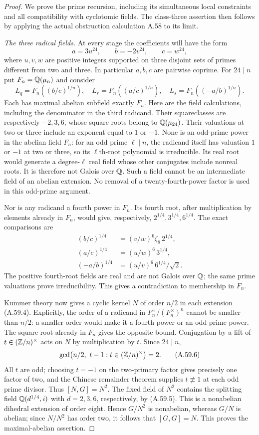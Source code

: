 \begin{proof}
We prove the prime recursion, including its simultaneous
local constraints and all compatibility with cyclotomic
fields. The class-three assertion then follows by applying
the actual obstruction calculation A.58 to its limit.

\emph{The three radical fields.}
At every stage the coefficients will have the form
\[
 a=3u^{24},\qquad b=-2v^{24},\qquad c=w^{24},
 \tag{A.59.3}
\]
where $u,v,w$ are positive integers supported on three
disjoint sets of primes different from two and three.
In particular $a,b,c$ are pairwise coprime.
For $24\mid n$ put $F_n=\mathbb Q(\mu_n)$ and consider
\[
 L_q=F_n((b/c)^{1/n}),\quad
 L_r=F_n((a/c)^{1/n}),\quad
 L_s=F_n((-a/b)^{1/n}).
 \tag{A.59.4}
\]
Each has maximal abelian subfield exactly $F_n$.
Here are the field calculations, including the denominator
in the third radicand. Their squareclasses are respectively
$-2,3,6$, whose square roots belong to $\mathbb Q(\mu_{24})$.
Their valuations at two or three include an exponent
equal to $1$ or $-1$. None is an odd-prime power in the
abelian field $F_n$: for an odd prime $\ell\mid n$,
the radicand itself has valuation $1$ or $-1$ at
two or three, so its $\ell$th-root polynomial is
irreducible. Its real root would generate a degree-$\ell$
real field whose other conjugates include nonreal roots.
It is therefore not Galois over $\mathbb Q$. Such a field
cannot be an intermediate field of an abelian extension.
No removal of a twenty-fourth-power factor is used
in this odd-prime argument.

Nor is any radicand a fourth power in $F_n$.
Its fourth root, after multiplication by elements
already in $F_n$, would give, respectively,
$2^{1/4},3^{1/4},6^{1/4}$. The exact comparisons are
\[
 \begin{split}
 (b/c)^{1/4}&=(v/w)^6\zeta_8\,2^{1/4},\\
 (a/c)^{1/4}&=(u/w)^6\,3^{1/4},\\
 (-a/b)^{1/4}&=(u/v)^6\,6^{1/4}/\sqrt2 .
 \end{split}
 \tag{A.59.5}
\]
The positive fourth-root fields are real and are not
Galois over $\mathbb Q$; the same prime valuations prove
irreducibility. This gives a contradiction to membership
in $F_n$.

Kummer theory now gives a cyclic kernel $N$ of order
$n/2$ in each extension (A.59.4). Explicitly, the order
of a radicand in $F_n^\times/(F_n^\times)^n$ cannot
be smaller than $n/2$: a smaller order would make it
a fourth power or an odd-prime power. The square root
already in $F_n$ gives the opposite bound.
Conjugation by a lift of
$t\in(\mathbb Z/n)^\times$ acts on $N$ by multiplication
by $t$. Since $24\mid n$,
\[
       \gcd\bigl(n/2,\ t-1:t\in(\Z/n)^\times\bigr)=2.
 \tag{A.59.6}
\]
All $t$ are odd; choosing $t=-1$ on the two-primary
factor gives precisely one factor of two, and the
Chinese remainder theorem supplies $t\not\equiv1$
at each odd prime divisor. Thus $[N,G]=N^2$.
The fixed field of $N^2$ contains the splitting field
$\mathbb Q(d^{1/4},i)$ with $d=2,3,6$, respectively, by
(A.59.5). This is a nonabelian dihedral extension
of order eight. Hence $G/N^2$ is nonabelian,
whereas $G/N$ is abelian; since $N/N^2$ has order
two, it follows that $[G,G]=N$.
This proves the maximal-abelian assertion.


\end{proof}
